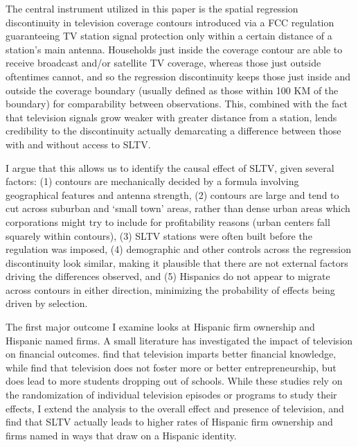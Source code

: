 \documentclass[11pt]{article}
\begin{document}

The central instrument utilized in this paper is the spatial regression discontinuity in television coverage contours introduced via a FCC regulation guaranteeing TV station signal protection only within a certain distance of a station's main antenna. Households just inside the coverage contour are able to receive broadcast and/or satellite TV coverage, whereas those just outside oftentimes cannot, and so the regression discontinuity keeps those just inside and outside the coverage boundary (usually defined as those within 100 KM of the boundary) for comparability between observations. This, combined with the fact that television signals grow weaker with greater distance from a station, lends credibility to the discontinuity actually demarcating a difference between those with and without access to SLTV.

I argue that this allows us to identify the causal effect of SLTV, given several factors: (1) contours are mechanically decided by a formula involving geographical features and antenna strength, (2) contours are large and tend to cut across suburban and `small town' areas, rather than dense urban areas which corporations might try to include for profitability reasons (urban centers fall squarely within contours), (3) SLTV stations were often built before the regulation was imposed, (4) demographic and other controls across the regression discontinuity look similar, making it plausible that there are not external factors driving the differences observed, and (5) Hispanics do not appear to migrate across contours in either direction, minimizing the probability of effects being driven by selection.

The first major outcome I examine looks at Hispanic firm ownership and Hispanic named firms. A small literature has investigated the impact of television on financial outcomes. \cite{bjorvatn_teaching_2019} find that television imparts better financial knowledge, while \cite{berg_harnessing_2017} find that television does not foster more or better entrepreneurship, but does lead to more students dropping out of schools. While these studies rely on the randomization of individual television episodes or programs to study their effects, I extend the analysis to the overall effect and presence of television, and find that SLTV actually leads to higher rates of Hispanic firm ownership and firms named in ways that draw on a Hispanic identity.
\end{document}
